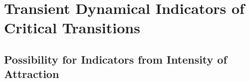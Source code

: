 \section{Transient Dynamical Indicators of Critical Transitions}
\label{sec:transient}



\subsection{Possibility for Indicators from Intensity of Attraction}
\label{subsec:indicatorsintensity}

